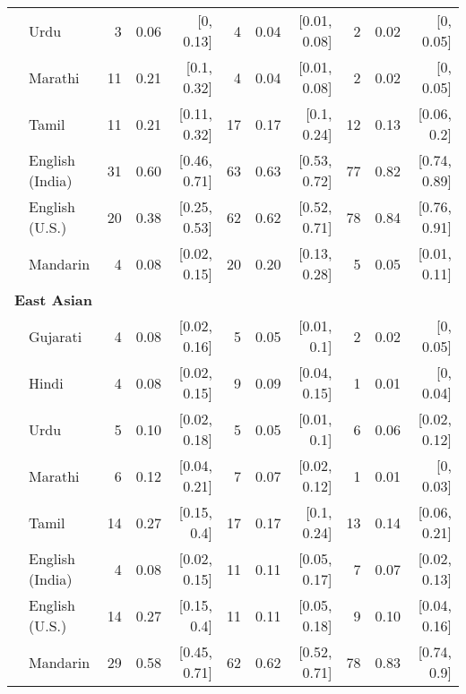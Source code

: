 \begin{table}[t]
\begin{footnotesize}
\begin{tabular}{p{.1in}lrrrrrrrrr}
 & Urdu & 3 & 0.06 & [0, 0.13] & 4 & 0.04 & [0.01, 0.08] & 2 & 0.02 & [0, 0.05]\\

 & Marathi & 11 & 0.21 & [0.1, 0.32] & 4 & 0.04 & [0.01, 0.08] & 2 & 0.02 & [0, 0.05]\\

 & Tamil & 11 & 0.21 & [0.11, 0.32] & 17 & 0.17 & [0.1, 0.24] & 12 & 0.13 & [0.06, 0.2]\\

 & English (India) & 31 & 0.60 & [0.46, 0.71] & 63 & 0.63 & [0.53, 0.72] & 77 & 0.82 & [0.74, 0.89]\\

 & English (U.S.) & 20 & 0.38 & [0.25, 0.53] & 62 & 0.62 & [0.52, 0.71] & 78 & 0.84 & [0.76, 0.91]\\

& Mandarin & 4 & 0.08 & [0.02, 0.15] & 20 & 0.20 & [0.13, 0.28] & 5 & 0.05 & [0.01, 0.11]\\
\midrule
\multicolumn{11}{l}{\textbf{East Asian}}\\
& Gujarati & 4 & 0.08 & [0.02, 0.16] & 5 & 0.05 & [0.01, 0.1] & 2 & 0.02 & [0, 0.05]\\

 & Hindi & 4 & 0.08 & [0.02, 0.15] & 9 & 0.09 & [0.04, 0.15] & 1 & 0.01 & [0, 0.04]\\

 & Urdu & 5 & 0.10 & [0.02, 0.18] & 5 & 0.05 & [0.01, 0.1] & 6 & 0.06 & [0.02, 0.12]\\

 & Marathi & 6 & 0.12 & [0.04, 0.21] & 7 & 0.07 & [0.02, 0.12] & 1 & 0.01 & [0, 0.03]\\

 & Tamil & 14 & 0.27 & [0.15, 0.4] & 17 & 0.17 & [0.1, 0.24] & 13 & 0.14 & [0.06, 0.21]\\

 & English (India) & 4 & 0.08 & [0.02, 0.15] & 11 & 0.11 & [0.05, 0.17] & 7 & 0.07 & [0.02, 0.13]\\

 & English (U.S.) & 14 & 0.27 & [0.15, 0.4] & 11 & 0.11 & [0.05, 0.18] & 9 & 0.10 & [0.04, 0.16]\\

& Mandarin & 29 & 0.58 & [0.45, 0.71] & 62 & 0.62 & [0.52, 0.71] & 78 & 0.83 & [0.74, 0.9]\\
\bottomrule
\end{tabular}
\end{footnotesize}
\end{table}